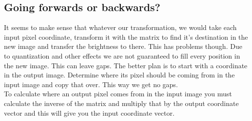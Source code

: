 \subsection{Going forwards or backwards?}
It seems to make sense that whatever our transformation, we would take each input pixel coordinate, transform it with the matrix to find it's destination in the new image and transfer the brightness to there. This has problems though. Due to quantization and other effects we are not guaranteed to fill every position in the new image. This can leave gaps. The better plan is to start with a coordinate in the output image. Determine where its pixel should be coming from in the input image and copy that over. This way we get no gaps. \\
To calculate where an output pixel comes from in the input image you must calculate the inverse of the matrix and multiply that by the output coordinate vector and this will give you the input coordinate vector.\\

\fi




